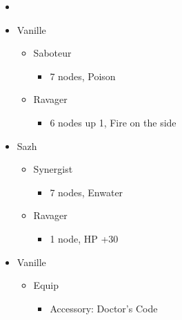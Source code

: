 \begin{menu}
\begin{itemize}
    \paradigm
    \begin{itemize}
        \item {}%
{\paradigmline{\rav}{\com}{}}%
{\paradigmline{(\sab)}{\com}{}}%
{\paradigmline[3]{\textit{\sab}}{\textit{\syn}}{}}%
{\paradigmline{\rav}{\rav}{}}%
{\paradigmline{[\sab]}{(\rav)}{}}%
{\paradigmline{[\sab]}{\com}{}}
    \end{itemize}
    \crystarium
    \begin{itemize}
        \item Vanille
        \begin{itemize}
            \item Saboteur
            \begin{itemize}
                \item 7 nodes, Poison
            \end{itemize}
            \item Ravager
            \begin{itemize}
                \item 6 nodes up 1, Fire on the side
            \end{itemize}
        \end{itemize}
        \item Sazh
        \begin{itemize}
            \item Synergist
            \begin{itemize}
                \item 7 nodes, Enwater
            \end{itemize}
            \item Ravager
            \begin{itemize}
                \item 1 node, HP +30
            \end{itemize}
        \end{itemize}
    \end{itemize}
    \equip
    \begin{itemize}
        \item Vanille
        \begin{itemize}
            \item Equip
            \begin{itemize}
                \item Accessory: Doctor's Code

\end{itemize}
\end{itemize}
\end{itemize}
\end{itemize}
\end{menu}
